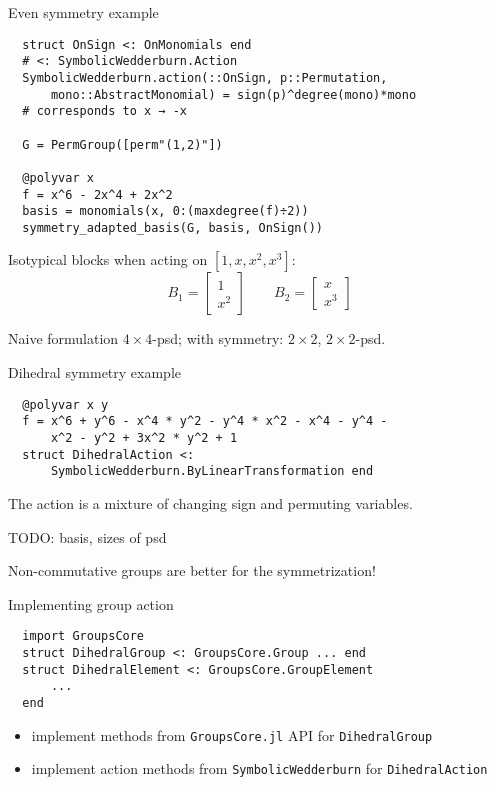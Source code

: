 \begin{frame}[fragile]{Even symmetry example}
\footnotesize
\begin{verbatim}
  struct OnSign <: OnMonomials end
  # <: SymbolicWedderburn.Action
  SymbolicWedderburn.action(::OnSign, p::Permutation, 
      mono::AbstractMonomial) = sign(p)^degree(mono)*mono
  # corresponds to x → -x
  
  G = PermGroup([perm"(1,2)"])
  
  @polyvar x
  f = x^6 - 2x^4 + 2x^2
  basis = monomials(x, 0:(maxdegree(f)÷2))
  symmetry_adapted_basis(G, basis, OnSign())  
\end{verbatim}

  Isotypical blocks when acting on $[1, x, x^2, x^3]$:
\[
  B_1 = \begin{bmatrix}
          1\\
          x^2
        \end{bmatrix}
  \qquad
  B_2 = \begin{bmatrix}
          x\\
          x^3
        \end{bmatrix}
\]

Naive formulation $4\times 4$-psd; with symmetry: $2\times 2$, $2\times 2$-psd.

\end{frame}

\begin{frame}[fragile]{Dihedral symmetry example}
\footnotesize
  \begin{verbatim}
  @polyvar x y
  f = x^6 + y^6 - x^4 * y^2 - y^4 * x^2 - x^4 - y^4 - 
      x^2 - y^2 + 3x^2 * y^2 + 1
  struct DihedralAction <: 
      SymbolicWedderburn.ByLinearTransformation end
  \end{verbatim}
  The action is a mixture of changing sign and permuting variables.

  TODO: basis,  sizes of psd
  
  Non-commutative groups are better for the symmetrization!
  
\end{frame}

\begin{frame}[fragile]{Implementing group action}
\footnotesize
  \begin{verbatim}
  import GroupsCore
  struct DihedralGroup <: GroupsCore.Group ... end
  struct DihedralElement <: GroupsCore.GroupElement
      ...
  end
  \end{verbatim}
\normalsize
  \begin{itemize}
    \item implement methods from \texttt{GroupsCore.jl} API for \texttt{DihedralGroup}
    \item implement action methods from \texttt{SymbolicWedderburn} for \texttt{DihedralAction}
  \end{itemize}
\end{frame}

